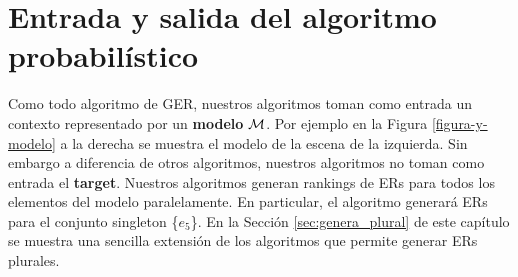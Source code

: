 \section{Entrada y salida del algoritmo probabil\'istico}
\label{input_algo}
Como todo algoritmo de GER, nuestros algoritmos toman como entrada un contexto representado por un \textbf{modelo} $\mathcal{M}$. Por ejemplo en la Figura \ref{figura-y-modelo} a la derecha se muestra el modelo de la escena de la izquierda. Sin embargo a diferencia de otros algoritmos, nuestros algoritmos no toman como entrada el \textbf{target}. Nuestros algoritmos generan rankings de ERs para todos los elementos del modelo paralelamente. En particular, el algoritmo generar\'a ERs para el conjunto singleton \{$e_5$\}. En la Secci\'on \ref{sec:genera_plural} de este cap\'itulo se muestra una sencilla extensi\'on de los algoritmos que permite generar ERs plurales.
